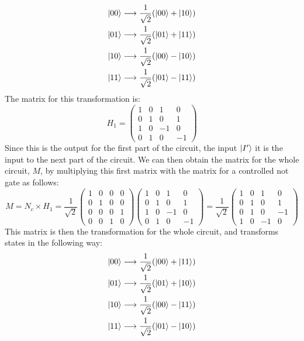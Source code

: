 \begin{align*}
    \ket{00} \longrightarrow \frac{1}{\sqrt{2}}(\ket{00} + \ket{10})\\
    \ket{01} \longrightarrow \frac{1}{\sqrt{2}}(\ket{01} + \ket{11})\\
    \ket{10} \longrightarrow \frac{1}{\sqrt{2}}(\ket{00} - \ket{10})\\
    \ket{11} \longrightarrow \frac{1}{\sqrt{2}}(\ket{01} - \ket{11})
\end{align*}
The matrix for this transformation is:
$$ H_1 = 
\begin{pmatrix}
1 & 0 & 1 & 0\\
0 & 1 & 0 & 1\\
1 & 0 & -1 & 0\\
0 & 1 & 0 & -1
\end{pmatrix}
$$
Since this is the output for the first part of the circuit, the input $\ket{I'}$ it is the input to the next part of the circuit. We can then obtain the matrix for the whole circuit, $M$, by multiplying this first matrix with the matrix for a controlled not gate as follows:
$$
M = N_c\times H_1 = \frac{1}{\sqrt{2}}
\begin{pmatrix}
1 & 0 & 0 & 0\\
0 & 1 & 0 & 0\\
0 & 0 & 0 & 1\\
0 & 0 & 1 & 0
\end{pmatrix}
\begin{pmatrix}
1 & 0 & 1 & 0\\
0 & 1 & 0 & 1\\
1 & 0 & -1 & 0\\
0 & 1 & 0 & -1
\end{pmatrix} = \frac{1}{\sqrt{2}}
\begin{pmatrix}
1 & 0 & 1 & 0\\
0 & 1 & 0 & 1\\
0 & 1 & 0 & -1\\
1 & 0 & -1 & 0
\end{pmatrix}
$$
This matrix is then the transformation for the whole circuit, and transforms states in the following way:
\begin{align*}
    \ket{00} \longrightarrow \frac{1}{\sqrt{2}}(\ket{00} + \ket{11})\\
    \ket{01} \longrightarrow \frac{1}{\sqrt{2}}(\ket{01} + \ket{10})\\
    \ket{10} \longrightarrow \frac{1}{\sqrt{2}}(\ket{00} - \ket{11})\\
    \ket{11} \longrightarrow \frac{1}{\sqrt{2}}(\ket{01} - \ket{10})
\end{align*}
